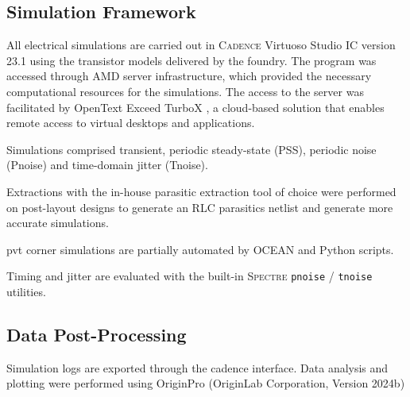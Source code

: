 \subsection{Simulation Framework}
All electrical simulations are carried out in \textsc{Cadence} Virtuoso Studio IC version 23.1 \cite{CadenceVirtuosoIC231ISR13} using the transistor models delivered by the foundry. The program was accessed through AMD server infrastructure, which provided the necessary computational resources for the simulations. The access to the server was facilitated by OpenText Exceed TurboX \cite{RedHatExceedTurboX}, a cloud-based solution that enables remote access to virtual desktops and applications.

Simulations comprised transient, periodic steady-state (PSS), periodic noise (Pnoise) and time-domain jitter (Tnoise).

Extractions with the in-house parasitic extraction tool of choice were performed on post-layout designs to generate an RLC parasitics netlist and generate more accurate simulations.

\gls{pvt} corner simulations are partially automated by \textsc{OCEAN} and Python scripts.

Timing and jitter are evaluated with the built-in \textsc{Spectre} \texttt{pnoise} / \texttt{tnoise} utilities. 


\subsection{Data Post-Processing}
Simulation logs are exported through the cadence interface. Data analysis and plotting were performed using OriginPro (OriginLab Corporation, Version 2024b) \cite{OriginLab2025}
